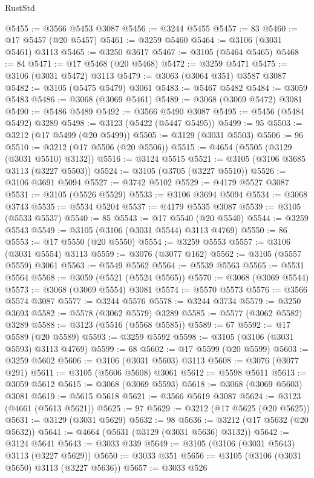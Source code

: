 \begin{lexlean}{RustStd}
\begin{coremodule}
@5455 := @3566 @5453 @3087
@5456 := @3244 @5455
@5457 := 83
@5460 := @17 @5457 (@20 @5457)
@5461 := @3259 @5460
@5464 := @3106 (@3031 @5461) @3113
@5465 := @3250 @3617
@5467 := @3105 (@5464 @5465)
@5468 := 84
@5471 := @17 @5468 (@20 @5468)
@5472 := @3259 @5471
@5475 := @3106 (@3031 @5472) @3113
@5479 := @3063 (@3064 @351) @3587 @3087
@5482 := @3105 (@5475 @5479) @3061
@5483 := @5467 @5482
@5484 := @3059 @5483
@5486 := @3068 (@3069 @5461)
@5489 := @3068 (@3069 @5472) @3081
@5490 := @5486 @5489
@5492 := @3566 @5490 @3087
@5495 := @5456 (@5484 @5492) @3289
@5498 := @3123 (@5422 (@5447 @5495))
@5499 := 95
@5503 := @3212 (@17 @5499 (@20 @5499))
@5505 := @3129 (@3031 @5503)
@5506 := 96
@5510 := @3212 (@17 @5506 (@20 @5506))
@5515 := @4654 (@5505 (@3129 (@3031 @5510) @3132))
@5516 := @3124 @5515
@5521 := @3105 (@3106 @3685 @3113 (@3227 @5503))
@5524 := @3105 (@3705 (@3227 @5510))
@5526 := @3106 @3691 @5094
@5527 := @3742 @5102
@5529 := @4179 @5527 @3087
@5531 := @3105 (@5526 @5529)
@5533 := @3106 @3694 @5094
@5534 := @3068 @3743
@5535 := @5534 @5204
@5537 := @4179 @5535 @3087
@5539 := @3105 (@5533 @5537)
@5540 := 85
@5543 := @17 @5540 (@20 @5540)
@5544 := @3259 @5543
@5549 := @3105 (@3106 (@3031 @5544) @3113 @4769)
@5550 := 86
@5553 := @17 @5550 (@20 @5550)
@5554 := @3259 @5553
@5557 := @3106 (@3031 @5554) @3113
@5559 := @3076 (@3077 @162)
@5562 := @3105 (@5557 @5559) @3061
@5563 := @5549 @5562
@5564 := @5539 @5563
@5565 := @5531 @5564
@5568 := @3059 (@5521 (@5524 @5565))
@5570 := @3068 (@3069 @5544)
@5573 := @3068 (@3069 @5554) @3081
@5574 := @5570 @5573
@5576 := @3566 @5574 @3087
@5577 := @3244 @5576
@5578 := @3244 @3734
@5579 := @3250 @3693
@5582 := @5578 (@3062 @5579) @3289
@5585 := @5577 (@3062 @5582) @3289
@5588 := @3123 (@5516 (@5568 @5585))
@5589 := 67
@5592 := @17 @5589 (@20 @5589)
@5593 := @3259 @5592
@5598 := @3105 (@3106 (@3031 @5593) @3113 @4769)
@5599 := 68
@5602 := @17 @5599 (@20 @5599)
@5603 := @3259 @5602
@5606 := @3106 (@3031 @5603) @3113
@5608 := @3076 (@3077 @291)
@5611 := @3105 (@5606 @5608) @3061
@5612 := @5598 @5611
@5613 := @3059 @5612
@5615 := @3068 (@3069 @5593)
@5618 := @3068 (@3069 @5603) @3081
@5619 := @5615 @5618
@5621 := @3566 @5619 @3087
@5624 := @3123 (@4661 (@5613 @5621))
@5625 := 97
@5629 := @3212 (@17 @5625 (@20 @5625))
@5631 := @3129 (@3031 @5629)
@5632 := 98
@5636 := @3212 (@17 @5632 (@20 @5632))
@5641 := @4664 (@5631 (@3129 (@3031 @5636) @3132))
@5642 := @3124 @5641
@5643 := @3033 @339
@5649 := @3105 (@3106 (@3031 @5643) @3113 (@3227 @5629))
@5650 := @3033 @351
@5656 := @3105 (@3106 (@3031 @5650) @3113 (@3227 @5636))
@5657 := @3033 @526

\end{coremodule}
\end{lexlean}
